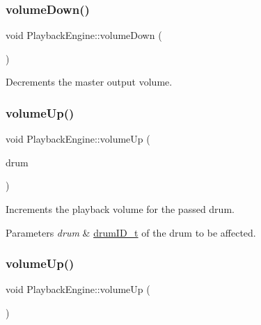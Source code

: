 \subsubsection{\texorpdfstring{volume\+Down()}{volumeDown()}\hspace{0.1cm}{\footnotesize\ttfamily [2/2]}}
{\footnotesize\ttfamily void Playback\+Engine\+::volume\+Down (\begin{DoxyParamCaption}{ }\end{DoxyParamCaption})}

Decrements the master output volume. \mbox{\label{classdrumpi_1_1audio_1_1PlaybackEngine_ac2010459b86f361199d812ad9123a948}} 
\subsubsection{\texorpdfstring{volume\+Up()}{volumeUp()}\hspace{0.1cm}{\footnotesize\ttfamily [1/2]}}
{\footnotesize\ttfamily void Playback\+Engine\+::volume\+Up (\begin{DoxyParamCaption}\item[{\hyperlink{namespacedrumpi_a3897274035c1b939a604438abe648b1b}{drum\+I\+D\+\_\+t}}]{drum }\end{DoxyParamCaption})}

Increments the playback volume for the passed drum. 
\begin{DoxyParams}{Parameters}
{\em drum} & \hyperlink{namespacedrumpi_a3897274035c1b939a604438abe648b1b}{drum\+I\+D\+\_\+t} of the drum to be affected. \\
\hline
\end{DoxyParams}
\mbox{\label{classdrumpi_1_1audio_1_1PlaybackEngine_a60538fdd91cf0891e0c5ba133e51dd98}} 
\subsubsection{\texorpdfstring{volume\+Up()}{volumeUp()}\hspace{0.1cm}{\footnotesize\ttfamily [2/2]}}
{\footnotesize\ttfamily void Playback\+Engine\+::volume\+Up (\begin{DoxyParamCaption}{ }\end{DoxyParamCaption})}

